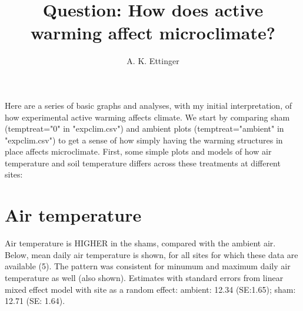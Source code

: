\documentclass{article}
\begin{document}

\title{Question: How does active warming affect microclimate?} %
\author{A. K. Ettinger}
\maketitle  %
Here are a series of basic graphs and analyses, with my initial interpretation, of how experimental active warming affects climate. We start by comparing sham (temptreat="0" in "expclim.csv") and  ambient plots (temptreat="ambient" in "expclim.csv") to get a sense of how simply having the warming structures in place affects microclimate. 
First, some simple plots and models of how air temperature and soil temperature differs across these treatments at different sites:


\section {Air temperature}
Air temperature is HIGHER in the shams, compared with the ambient air. Below, mean daily air temperature is shown, for all sites for which these data are available (5). The pattern was consistent for minumum and maximum daily air temperature as well (also shown). Estimates with standard errors from linear mixed effect model with site as a random effect: ambient: 12.34 (SE:1.65); sham: 12.71 (SE: 1.64).
\end{document}
